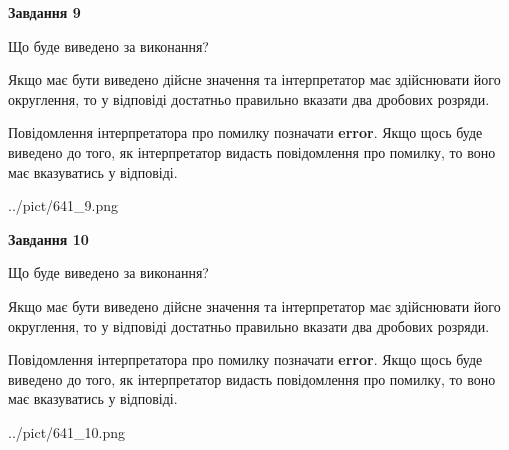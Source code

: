 \documentclass[12pt, ukrainian]{article}
\begin{document}
{\begin {Large}
{\begin {center}\textbf{Завдання 9}\end {center}}\par
Що буде виведено за виконання? \par

Якщо має бути виведено дійсне значення та інтерпретатор має здійснювати його округлення, 
то у відповіді достатньо правильно вказати два дробових розряди.

Повідомлення інтерпретатора про помилку позначати \textbf{error}.
Якщо щось буде виведено до того, як інтерпретатор видасть повідомлення про помилку, 
то воно має вказуватись у відповіді. \par

\begin{center}
	{../pict/641_9.png}
\end{center}
\newpage

{\begin {center}\textbf{Завдання 10}\end {center}}\par
Що буде виведено за виконання? \par

Якщо має бути виведено дійсне значення та інтерпретатор має здійснювати його округлення, 
то у відповіді достатньо правильно вказати два дробових розряди.

Повідомлення інтерпретатора про помилку позначати \textbf{error}.
Якщо щось буде виведено до того, як інтерпретатор видасть повідомлення про помилку, 
то воно має вказуватись у відповіді. \par

\begin{center}
	{../pict/641_10.png}
\end{center}
\newpage

\end {Large}}
\end{document}
